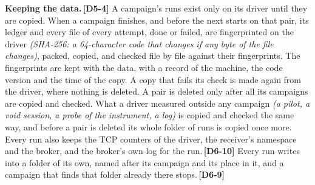 \documentclass[11pt]{article}
\newcommand{\gl}[1]{{\color{soft}\itshape\small (#1)}}
\newcommand{\chgold}[1]{\,{\color{oldcol}\bfseries\footnotesize[#1]}}
\begin{document}
\textbf{Keeping the data.}\chgold{D5-4} A campaign's runs exist only on its driver until they are copied. When a campaign finishes, and before the next starts on that pair, its ledger and every file of every attempt, done or failed, are fingerprinted on the driver \gl{SHA-256: a 64-character code that changes if any byte of the file changes}, packed, copied, and checked file by file against their fingerprints. The fingerprints are kept with the data, with a record of the machine, the code version and the time of the copy. A copy that fails its check is made again from the driver, where nothing is deleted. A pair is deleted only after all its campaigns are copied and checked. What a driver measured outside any campaign \gl{a pilot, a void session, a probe of the instrument, a log} is copied and checked the same way, and before a pair is deleted its whole folder of runs is copied once more. Every run also keeps the TCP counters of the driver, the receiver's namespace and the broker, and the broker's own log for the run.\chgold{D6-10} Every run writes into a folder of its own, named after its campaign and its place in it, and a campaign that finds that folder already there stops.\chgold{D6-9}
\end{document}
